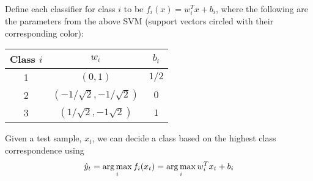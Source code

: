 Define each classifier for class $i$ to be $f_i(x) = w_i^T x + b_i$,
where the following are the parameters from the above SVM (support vectors circled with their corresponding color):

\begin{center}
    \begin{tabular}{c | c | c}
        Class $i$ & $w_i$ & $b_i$ \\
        \hline
        1 & $(0,1)$                      & $1/2$  \\ 
        2 & $(-1/\sqrt{2}, -1/\sqrt{2})$ & $0$ \\ 
        3 & $(1/\sqrt{2}, -1\sqrt{2})$   & $1$  
    \end{tabular}
\end{center}

Given a test sample, $x_t$, we can decide a class based on the highest class correspondence using 
$$
\hat{y}_t = \operatorname*{arg\,max}_i f_i(x_t) = \operatorname*{arg\,max}_i w_i^T x_t + b_i
$$
